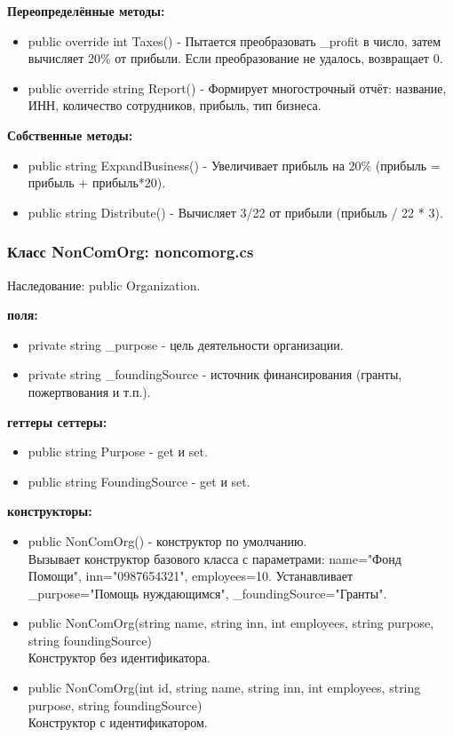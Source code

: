 \documentclass[oneside,a4paper,14pt]{extarticle}
\begin{document}
\textbf{Переопределённые методы:}
\begin{itemize}
    \item public override int Taxes() - Пытается преобразовать \_profit в число, затем вычисляет 20\% от прибыли. Если преобразование не удалось, возвращает 0.
    \item public override string Report() - Формирует многострочный отчёт: название, ИНН, количество сотрудников, прибыль, тип бизнеса.
\end{itemize}

\textbf{Собственные методы:}
\begin{itemize}
    \item public string ExpandBusiness() - Увеличивает прибыль на 20\% (прибыль = прибыль + прибыль*20).
    \item public string Distribute() - Вычисляет 3/22 от прибыли (прибыль / 22 * 3).
\end{itemize}

\newpage

\subsubsection*{Класс NonComOrg: noncomorg.cs}

Наследование: public Organization.

\textbf{поля:}
\begin{itemize}
    \item private string \_purpose - цель деятельности организации.
    \item private string \_foundingSource - источник финансирования (гранты, пожертвования и т.п.).
\end{itemize}

\textbf{геттеры сеттеры:}
\begin{itemize}
    \item public string Purpose - get и set.
    \item public string FoundingSource - get и set.
\end{itemize}

\textbf{конструкторы:}
\begin{itemize}
    \item public NonComOrg() - конструктор по умолчанию.\\
    Вызывает конструктор базового класса с параметрами: name="Фонд Помощи", inn="0987654321", employees=10. Устанавливает \_purpose="Помощь нуждающимся", \_foundingSource="Гранты".

    \item public NonComOrg(string name, string inn, int employees, string purpose, string foundingSource)\\
    Конструктор без идентификатора.

    \item public NonComOrg(int id, string name, string inn, int employees, string purpose, string foundingSource)
    \\Конструктор с идентификатором.
\end{itemize}
\end{document}
